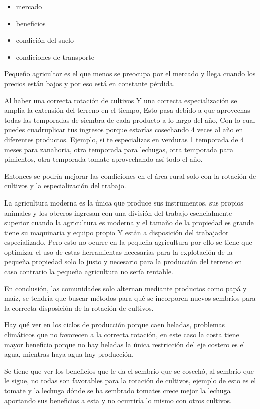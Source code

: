 \documentclass[
  a4paper,
]{article}
\begin{document}
\begin{itemize}
\item
  mercado
\item
  beneficios
\item
  condición del suelo
\item
  condiciones de transporte
\end{itemize}

Pequeño agricultor es el que menos se preocupa por el mercado y llega
cuando los precios están bajos y por eso está en constante pérdida.

Al haber una correcta rotación de cultivos Y una correcta
especialización se amplía la extensión del terreno en el tiempo, Esto
pasa debido a que aprovechas todas las temporadas de siembra de cada
producto a lo largo del año, Con lo cual puedes cuadruplicar tus
ingresos porque estarías cosechando 4 veces al año en diferentes
productos. Ejemplo, si te especializas en verduras 1 temporada de 4
meses para zanahoria, otra temporada para lechugas, otra temporada para
pimientos, otra temporada tomate aprovechando así todo el año.

Entonces se podría mejorar las condiciones en el área rural solo con la
rotación de cultivos y la especialización del trabajo.

La agricultura moderna es la única que produce sus instrumentos, sus
propios animales y los obreros ingresan con una división del trabajo
esencialmente superior cuando la agricultura es moderna y el tamaño de
la propiedad es grande tiene su maquinaria y equipo propio Y están a
disposición del trabajador especializado, Pero esto no ocurre en la
pequeña agricultura por ello se tiene que optimizar el uso de estas
herramientas necesarias para la explotación de la pequeña propiedad solo
lo justo y necesario para la producción del terreno en caso contrario la
pequeña agricultura no sería rentable.

En conclusión, las comunidades solo alternan mediante productos como
papá y maíz, se tendría que buscar métodos para qué se incorporen nuevos
sembríos para la correcta disposición de la rotación de cultivos.

Hay qué ver en los ciclos de producción porque caen heladas, problemas
climáticos que no favorecen a la correcta rotación, en este caso la
costa tiene mayor beneficio porque no hay heladas la única restricción
del eje costero es el agua, mientras haya agua hay producción.

Se tiene que ver los beneficios que le da el sembrío que se cosechó, al
sembrío que le sigue, no todas son favorables para la rotación de
cultivos, ejemplo de esto es el tomate y la lechuga dónde se ha sembrado
tomates crece mejor la lechuga aportando sus beneficios a esta y no
ocurriría lo mismo con otros cultivos.
\end{document}
